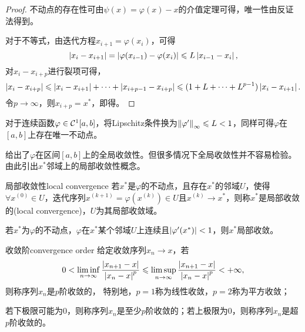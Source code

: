 \begin{proof}
    不动点的存在性可由$\psi(x)=\varphi(x)-x$的介值定理可得，唯一性由反证法得到。

    对于不等式，由迭代方程$x_{i+1}=\varphi(x_i)$，可得
    \[
        \left\lvert x_i-x_{i+1}\right\rvert=\left\lvert\varphi(x_{i-1})-\varphi(x_i)\right\rvert\leqslant L\left\lvert x_{i-1}-x_i\right\rvert,
    \]
    对$x_i-x_{i+p}$进行裂项可得，
    \[
        \left\lvert x_i-x_{i+p}\right\rvert\leqslant\left\lvert x_i-x_{i+1}\right\rvert+\cdots+\left\lvert x_{i+p-1}-x_{i+p}\right\rvert\leqslant(1+L+\cdots+L^{p-1})\left\lvert x_i-x_{i+1}\right\rvert.
    \]
    令$p\to\infty$，则$x_{i+p}=x^*$，即得。
\end{proof}

\begin{corollary}
    对于连续函数$\varphi\in\mathcal C^1[a,b]$，将Lipschitz条件换为$\left\lVert\varphi'\right\rVert_\infty\leqslant L<1$，同样可得$\varphi$在$[a,b]$上存在唯一不动点。
\end{corollary}

\begin{remark}
     给出了$\varphi$在区间$[a,b]$上的全局收敛性。但很多情况下全局收敛性并不容易检验。由此引出$x^*$邻域上的局部收敛性概念。
\end{remark}

\begin{definition}
    {局部收敛性}{local convergence}
    若$x^*$是$\varphi$的不动点，且存在$x^*$的邻域$U$，使得$\forall x^{(0)}\in U$，迭代序列$x^{(k+1)}=\varphi(x^{(k)})\in U$且$x^{(k)}\to x^*$，则称$x^*$是局部收敛的(local convergence)，$U$为其局部收敛域。
\end{definition}

\begin{corollary}
    若$x^*$为$\varphi$的不动点，$\varphi$在$x^*$某个邻域$U$上连续且$\left\lvert\varphi'(x^*)\right\rvert<1$，则$x^*$局部收敛。
\end{corollary}

\begin{definition}
    {收敛阶}{convergence order}
    给定收敛序列$x_n\to x$，若
    \begin{equation}
        0<\liminf_{n\to\infty}\frac{\left\lvert x_{n+1}-x\right\rvert}{\left\lvert x_n-x\right\rvert^p}\leqslant\limsup_{n\to\infty}\frac{\left\lvert x_{n+1}-x\right\rvert}{\left\lvert x_n-x\right\rvert^p}<+\infty,
    \end{equation}
    则称序列$x_n$是$p$阶收敛的，
    特别地，$p=1$称为线性收敛，$p=2$称为平方收敛；

    若下极限可能为0，则称序列$x_n$是至少$p$阶收敛的；若上极限为0，则称序列$x_n$是超$p$阶收敛的。
\end{definition}


